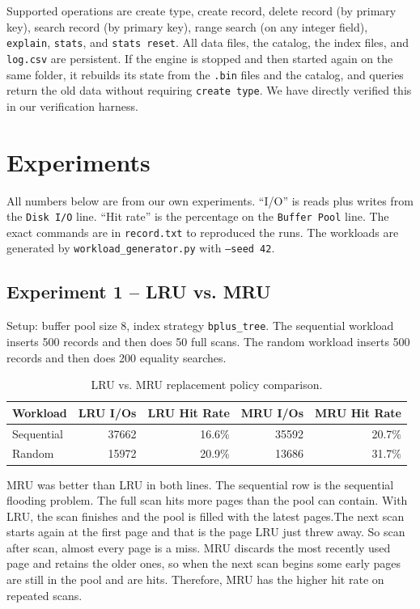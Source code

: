 \documentclass[12pt]{article}
\begin{document}
Supported operations are create type, create record, delete record (by
primary key), search record (by primary key), range search (on any integer
field), \texttt{explain}, \texttt{stats}, and \texttt{stats reset}. All
data files, the catalog, the index files, and \texttt{log.csv} are
persistent. If the engine is stopped and then started again on the same folder,
it rebuilds its state from the \texttt{.bin} files and the catalog, and
queries return the old data without requiring \texttt{create type}. We have directly verified
this in our verification harness.

\section{Experiments}

All numbers below are from our own experiments. ``I/O'' is reads plus writes from
the \texttt{Disk I/O} line. ``Hit rate'' is the percentage on the
\texttt{Buffer Pool} line. The exact commands are in \texttt{record.txt} to
reproduced the runs. The workloads are generated by
\texttt{workload\_generator.py} with \texttt{--seed 42}.

\subsection{Experiment 1 -- LRU vs. MRU}

Setup: buffer pool size 8, index strategy \texttt{bplus\_tree}. The
sequential workload inserts 500 records and then does 50 full scans. The
random workload inserts 500 records and then does 200 equality searches.

\begin{table}[H]
\centering
\caption{LRU vs. MRU replacement policy comparison.}
\begin{tabular}{@{}lrrrr@{}}
\toprule
Workload & LRU I/Os & LRU Hit Rate & MRU I/Os & MRU Hit Rate \\
\midrule
Sequential & 37662 & 16.6\% & 35592 & 20.7\% \\
Random     & 15972 & 20.9\% & 13686 & 31.7\% \\
\bottomrule
\end{tabular}
\end{table}

MRU was better than LRU in both lines. The sequential row is the
sequential flooding problem. The full scan hits more pages than the pool
can contain. With LRU, the scan finishes and the pool is filled with the
latest pages.The next scan starts again at the first page and that is the
page LRU just threw away. So scan after scan, almost every page is a miss. MRU discards the most recently used page and retains the older ones, 
so when the next scan begins some early pages are still in the pool and are hits. 
Therefore, MRU has the higher hit rate on
repeated scans.
\end{document}
